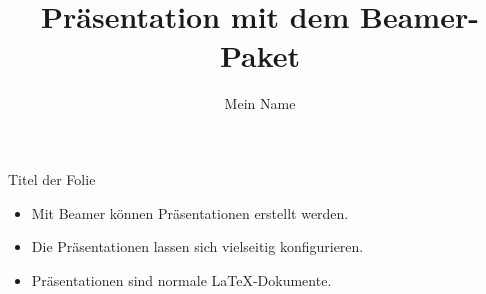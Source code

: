 \documentclass{beamer}
\title{Präsentation mit dem Beamer-Paket}
\author{Mein Name}
\begin{document}
\maketitle

\begin{frame}{Titel der Folie}
  \begin{itemize}
    \item<1-> Mit Beamer können Präsentationen erstellt werden.
    \item<2-> Die Präsentationen lassen sich vielseitig konfigurieren.
    \item<3-> Präsentationen sind normale \LaTeX-Dokumente.
  \end{itemize}
\end{frame}
\end{document}
